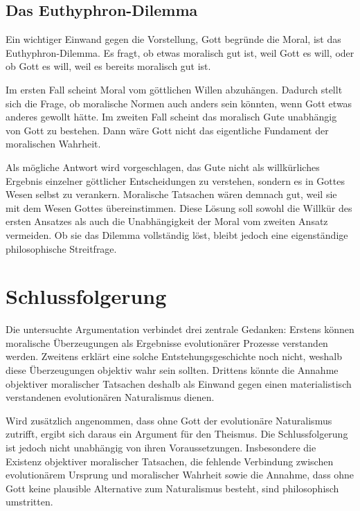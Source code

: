 \documentclass[a4paper,11pt]{article}
\begin{document}
	\subsection{Das Euthyphron-Dilemma}
	
	Ein wichtiger Einwand gegen die Vorstellung, Gott begründe die
	Moral, ist das Euthyphron-Dilemma. Es fragt, ob etwas moralisch
	gut ist, weil Gott es will, oder ob Gott es will, weil es bereits
	moralisch gut ist.
	
	Im ersten Fall scheint Moral vom göttlichen Willen abzuhängen.
	Dadurch stellt sich die Frage, ob moralische Normen auch anders
	sein könnten, wenn Gott etwas anderes gewollt hätte. Im zweiten
	Fall scheint das moralisch Gute unabhängig von Gott zu bestehen.
	Dann wäre Gott nicht das eigentliche Fundament der moralischen
	Wahrheit.
	
	Als mögliche Antwort wird vorgeschlagen, das Gute nicht als
	willkürliches Ergebnis einzelner göttlicher Entscheidungen zu
	verstehen, sondern es in Gottes Wesen selbst zu verankern.
	Moralische Tatsachen wären demnach gut, weil sie mit dem Wesen
	Gottes übereinstimmen. Diese Lösung soll sowohl die Willkür des
	ersten Ansatzes als auch die Unabhängigkeit der Moral vom
	zweiten Ansatz vermeiden. Ob sie das Dilemma vollständig löst,
	bleibt jedoch eine eigenständige philosophische Streitfrage.
	
	\section{Schlussfolgerung}
	
	Die untersuchte Argumentation verbindet drei zentrale Gedanken:
	Erstens können moralische Überzeugungen als Ergebnisse
	evolutionärer Prozesse verstanden werden. Zweitens erklärt
	eine solche Entstehungsgeschichte noch nicht, weshalb diese
	Überzeugungen objektiv wahr sein sollten. Drittens könnte die
	Annahme objektiver moralischer Tatsachen deshalb als Einwand
	gegen einen materialistisch verstandenen evolutionären
	Naturalismus dienen.
	
	Wird zusätzlich angenommen, dass ohne Gott der evolutionäre
	Naturalismus zutrifft, ergibt sich daraus ein Argument für den
	Theismus. Die Schlussfolgerung ist jedoch nicht unabhängig von
	ihren Voraussetzungen. Insbesondere die Existenz objektiver
	moralischer Tatsachen, die fehlende Verbindung zwischen
	evolutionärem Ursprung und moralischer Wahrheit sowie die
	Annahme, dass ohne Gott keine plausible Alternative zum
	Naturalismus besteht, sind philosophisch umstritten.
	
\end{document}
